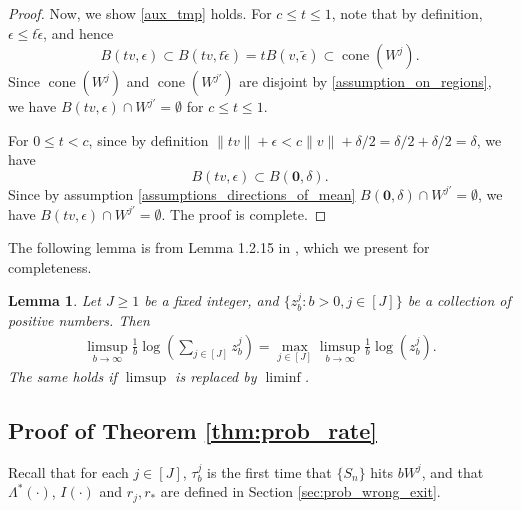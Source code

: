 \documentclass[aap,preprint]{imsart}
\theoremstyle{plain}
\newtheorem{lemma}[theorem]{Lemma}
\theoremstyle{definition}
\begin{document}
\begin{appendix}
\begin{proof}
Now, we show \eqref{aux_tmp} holds. For $c \leq t \leq 1$, note that by definition, $\epsilon \leq t \tilde{\epsilon}$, and hence
$$ 
B(tv, \epsilon) \subset  B(tv, t \tilde{\epsilon}) = t B(v, \tilde{\epsilon}) \subset \operatorname{cone}(W^j).
$$
Since $\operatorname{cone}(W^j)$ and $\operatorname{cone}(W^{j'})$ are disjoint by \eqref{assumption_on_regions}, we have 
$B(tv, \epsilon) \cap  W^{j'}  = \emptyset$ for $c \leq t \leq 1$.

For $0 \leq t < c$, since by definition
$\|tv\| + \epsilon < c \|v\| + \delta/2 = \delta/2 + \delta/2 = \delta$, 
we have
$$
B(tv, \epsilon)  \subset {B(\textbf{0},\delta)}.
$$
Since by assumption \eqref{assumptions_directions_of_mean} $ {B(\textbf{0},\delta)}\cap W^{j'} =\emptyset$, we have
 $B(tv, \epsilon) \cap W^{j'} = \emptyset$. The proof is complete.
\end{proof}




The following lemma is from  Lemma 1.2.15  in \cite{dembo2009large}, which we present for completeness.

\begin{lemma}\label{lemma:log_max_sum}
Let $J \geq 1$ be a fixed integer, and $\{z_b^j: b>0, j \in [J] \}$ be a collection of positive numbers. Then
\begin{align*}
    \limsup_{b \to \infty} \frac{1}{b} \log\left(\sum_{j \in [J]} z_b^j \right) = 
       \max_{j \in [J]} \limsup_{b \to \infty} \frac{1}{b} \log\left(z_b^j\right).
\end{align*}
The same holds if $\limsup$ is replaced by $\liminf$.
\end{lemma}



\subsection{Proof of Theorem \ref{thm:prob_rate}}
\label{app:lower_bound_exit}
Recall that for each $j \in [J]$, $\tau_b^j$ is the first time that $\{S_n\}$ hits $b W^j$, and that $\Lambda^*(\cdot)$, $I(\cdot)$ and $r_j, r_*$ are defined in Section \ref{sec:prob_wrong_exit}. 




\end{appendix}
\end{document}
